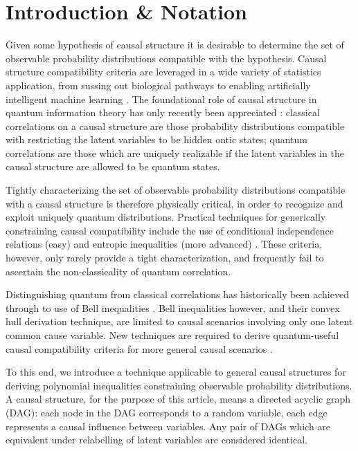 \section{Introduction \& Notation}
Given some hypothesis of causal structure it is desirable to determine the set of observable probability distributions compatible with the hypothesis. Causal structure compatibility criteria are leveraged in a wide variety of statistics application, from sussing out biological pathways to enabling artificially intelligent machine learning \cite{pearl2009causality,spirtes2011causation,studeny2005probabilistic,koller2009probabilistic}. The foundational role of causal structure in quantum information theory has only recently been appreciated \cite{WoodSpekkens,fritz2012bell,pusey2014gdag,BeyondBellII}: classical correlations on a causal structure are those probability distributions compatible with restricting the latent variables to be hidden ontic states; quantum correlations are those which are uniquely realizable if the latent variables in the causal structure are allowed to be quantum states.

Tightly characterizing the set of observable probability distributions compatible with a causal structure is therefore physically critical, in order to recognize and exploit uniquely quantum distributions. Practical techniques for generically constraining causal compatibility include the use of conditional independence relations (easy) \cite{pearl2009causality,spirtes2011causation,studeny2005probabilistic,koller2009probabilistic} and entropic inequalities (more advanced) \cite{fritz2013marginal,chaves2014novel,chaves2014informationinference}. These criteria, however, only rarely provide a tight characterization, and frequently fail to ascertain the non-classicality of quantum correlation.%

Distinguishing quantum from classical correlations has historically been achieved through to use of Bell inequalities \cite{bell1966lhvm,GisinFramework2012,scarani2012device,Brunner2013Bell}. Bell inequalities however, and their convex hull derivation technique, are limited to causal scenarios involving only one latent common cause variable. New techniques are required to derive quantum-useful causal compatibility criteria for more general causal scenarios \cite{fritz2012bell,pusey2014gdag,BeyondBellII}.

To this end, we introduce a technique applicable to general causal structures for deriving polynomial inequalities constraining observable probability distributions. A causal structure, for the purpose of this article, means a directed acyclic graph (DAG): each node in the DAG corresponds to a random variable, each edge represents a causal influence between variables. Any pair of DAGs which are equivalent under relabelling of latent variables are considered identical.

